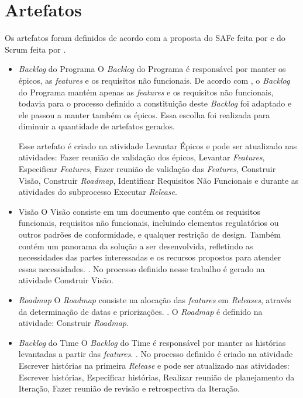\section{Artefatos}

Os artefatos foram definidos de acordo com a proposta do SAFe feita por  e do Scrum feita 
por .

\begin{itemize}
  \item \textit{Backlog} do Programa
    \subitem O \textit{Backlog} do Programa é responsável por manter os épicos, as \textit{features} e os requisitos
    não funcionais. De acordo com , o \textit{Backlog} do Programa mantém apenas as \textit{features} e os requisitos não funcionais,
    todavia para o processo definido a constituição deste \textit{Backlog} foi adaptado e ele passou a manter também
    os épicos. Essa escolha foi realizada para diminuir a quantidade de artefatos gerados. 
    
    Esse artefato é criado na atividade Levantar Épicos e 
    pode ser atualizado nas atividades: Fazer reunião de validação dos épicos, Levantar \textit{Features}, Especificar \textit{Features}, 
Fazer reunião de validação das \textit{Features}, Construir Visão, Construir \textit{Roadmap}, Identificar Requisitos Não Funcionais e durante as atividades
do subprocesso Executar \textit{Release}.
  
  \item Visão
   \subitem O Visão consiste em um documento que contém os requisitos funcionais, requisitos não funcionais, incluindo elementos regulatórios 
   ou outros padrões de conformidade, e qualquer restrição de design. Também contém um panorama da solução a ser desenvolvida, 
   refletindo as necessidades das partes interessadas e os recursos propostos para atender essas necessidades. \cite{safe}.
   No processo definido nesse trabalho é gerado na atividade Construir Visão.
  
  \item \textit{Roadmap}
     \subitem O \textit{Roadmap} consiste na alocação das \textit{features} em \textit{Releases}, através da determinação de datas e priorizações. \cite{safe}.
     O \textit{Roadmap} é definido na atividade: Construir \textit{Roadmap}.

    
  \item \textit{Backlog} do Time
      \subitem O \textit{Backlog} do Time é responsável por manter as histórias levantadas a partir das \textit{features}.  \cite{safe}. No processo definido
      é criado na atividade Escrever histórias na primeira \textit{Release} e pode ser atualizado nas atividades: Escrever histórias, Especificar histórias, Realizar reunião de planejamento 
      da Iteração, Fazer reunião de revisão e retrospectiva da Iteração.
  

\end{itemize}
